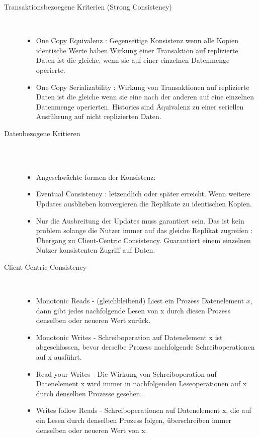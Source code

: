 \documentclass[a4paper,10pt,titlepage=false]{scrreprt}
\begin{document}
\begin{description}
  \item[Transaktionsbezoegene Kriterien (Strong Consistency)] \hfill \\
  \begin{itemize}
     \item One Copy Equivalenz : Gegenseitige Konsistenz wenn alle Kopien identische Werte haben.Wirkung einer Transaktion auf replizierte Daten ist die gleiche, wenn sie auf einer einzelnen Datenmenge operierte.
     \item One Copy Serializability : Wirkung von Transaktionen auf replizierte Daten ist die gleiche wenn sie eine nach der anderen auf eine einzelnen Datenmenge operierten. Histories sind Äquivalenz zu einer seriellen Ausführung auf nicht replizierten Daten.
   \end{itemize} 
   \item[Datenbezogene Kritieren] \hfill \\\
   \begin{itemize}
     \item Angeschwächte formen der Konsistenz:
     \item Eventual Consistency : letzendlich oder später erreicht. Wenn weitere Updates ausblieben konvergieren die Replikate zu identischen Kopien.
     \item Nur die Ausbreitung der Updates muss garantiert sein. Das ist kein problem solange die Nutzer immer auf das gleiche Replikat zugreifen :
     \subitem Übergang zu Client-Centric Consistency. Guarantiert einem einzelnen Nutzer konsistenten Zugriff auf Daten.

   \end{itemize}
   \item[Client Centric Consistency] \hfill  \\
   \begin{itemize}
     \item Monotonic Reads - (gleichbleibend) Liest ein Prozess Datenelement $x$, dann gibt jedes nachfolgende Lesen von x durch diesen Prozess denselben oder neueren Wert zurück.
     \item Monotonic Writes - Schreiboperation auf Datenelement x ist abgeschlossen, bevor derselbe Prozess nachfolgende Schreiboperationen auf x ausführt.
     \item Read your Writes - Die Wirkung von Schreiboperation auf Datenelement x wird immer in nachfolgenden Leseoperationen auf x durch denselben Prozesse gesehen.
     \item Writes follow Reads - Schreiboperationen auf Datenelement x, die auf ein Lesen durch denselben Prozess folgen, überschreiben immer denselben oder neueren Wert von x. 
   \end{itemize}
\end{description}
\end{document}
